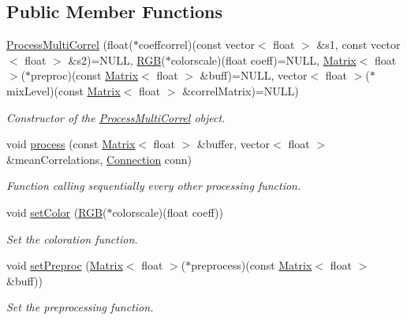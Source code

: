 \subsection*{Public Member Functions}
\begin{DoxyCompactItemize}
\item 
\mbox{\hyperlink{class_process_multi_correl_ab24bdd4426846c03e160ee418ef53962}{Process\+Multi\+Correl}} (float($\ast$coeffcorrel)(const vector$<$ float $>$ \&s1, const vector$<$ float $>$ \&s2)=N\+U\+LL, \mbox{\hyperlink{class_r_g_b}{R\+GB}}($\ast$colorscale)(float coeff)=N\+U\+LL, \mbox{\hyperlink{class_matrix}{Matrix}}$<$ float $>$($\ast$preproc)(const \mbox{\hyperlink{class_matrix}{Matrix}}$<$ float $>$ \&buff)=N\+U\+LL, vector$<$ float $>$($\ast$mix\+Level)(const \mbox{\hyperlink{class_matrix}{Matrix}}$<$ float $>$ \&correl\+Matrix)=N\+U\+LL)
\begin{DoxyCompactList}\small\item\em Constructor of the \mbox{\hyperlink{class_process_multi_correl}{Process\+Multi\+Correl}} object. \end{DoxyCompactList}\item 
void \mbox{\hyperlink{class_process_multi_correl_a3f8fed43cb4088f30ae575ff4b99db30}{process}} (const \mbox{\hyperlink{class_matrix}{Matrix}}$<$ float $>$ \&buffer, vector$<$ float $>$ \&mean\+Correlations, \mbox{\hyperlink{class_connection}{Connection}} conn)
\begin{DoxyCompactList}\small\item\em Function calling sequentially every other processing function. \end{DoxyCompactList}\item 
void \mbox{\hyperlink{class_process_multi_correl_a3e59014e6e62c9559507c2fc62c683a2}{set\+Color}} (\mbox{\hyperlink{class_r_g_b}{R\+GB}}($\ast$colorscale)(float coeff))
\begin{DoxyCompactList}\small\item\em Set the coloration function. \end{DoxyCompactList}\item 
void \mbox{\hyperlink{class_process_multi_correl_a60bb0450ffa0267f2a1cb74e617d06c5}{set\+Preproc}} (\mbox{\hyperlink{class_matrix}{Matrix}}$<$ float $>$($\ast$preprocess)(const \mbox{\hyperlink{class_matrix}{Matrix}}$<$ float $>$ \&buff))
\begin{DoxyCompactList}\small\item\em Set the preprocessing function. \end{DoxyCompactList}\item 

\end{DoxyCompactItemize}
